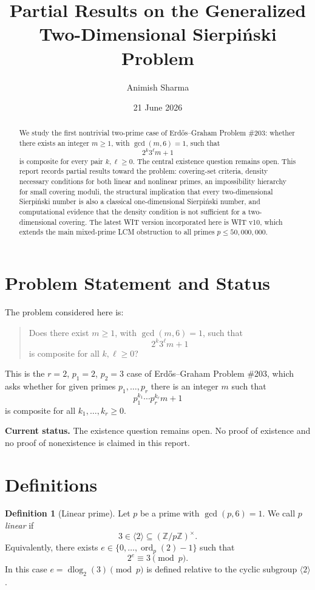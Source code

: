 \documentclass[11pt]{article}
\title{Partial Results on the Generalized Two-Dimensional Sierpi\'nski Problem}
\author{Animish Sharma}
\date{21 June 2026}
\theoremstyle{definition}
\newtheorem{definition}[theorem]{Definition}
\theoremstyle{remark}
\DeclareMathOperator{\ord}{ord}
\DeclareMathOperator{\dlog}{dlog}
\begin{document}
\maketitle

\begin{abstract}
We study the first nontrivial two-prime case of Erd\H{o}s--Graham Problem
\#203: whether there exists an integer \(m\geq 1\), with \(\gcd(m,6)=1\),
such that
\[
        2^k 3^\ell m+1
\]
is composite for every pair \(k,\ell\geq 0\).  The central existence question
remains open.  This report records partial results toward the problem:
covering-set criteria, density necessary conditions for both linear and
nonlinear primes, an impossibility hierarchy for small covering moduli, the
structural implication that every two-dimensional Sierpi\'nski number is also a
classical one-dimensional Sierpi\'nski number, and computational evidence that
the density condition is not sufficient for a two-dimensional covering.  The
latest WIT version incorporated here is WIT v10, which extends the main
mixed-prime LCM obstruction to all primes \(p\leq 50{,}000{,}000\).
\end{abstract}

\section{Problem Statement and Status}

The problem considered here is:

\begin{quote}
Does there exist \(m\geq 1\), with \(\gcd(m,6)=1\), such that
\[
        2^k3^\ell m+1
\]
is composite for all \(k,\ell\geq 0\)?
\end{quote}

This is the \(r=2\), \(p_1=2\), \(p_2=3\) case of Erd\H{o}s--Graham Problem
\#203, which asks whether for given primes \(p_1,\ldots,p_r\) there is an
integer \(m\) such that
\[
        p_1^{k_1}\cdots p_r^{k_r}m+1
\]
is composite for all \(k_1,\ldots,k_r\geq 0\).

\medskip
\noindent
\textbf{Current status.}  The existence question remains open.  No proof of
existence and no proof of nonexistence is claimed in this report.

\section{Definitions}

\begin{definition}[Linear prime]
Let \(p\) be a prime with \(\gcd(p,6)=1\).  We call \(p\) \emph{linear} if
\[
        3\in \langle 2\rangle \subseteq (\mathbb Z/p\mathbb Z)^\times.
\]
Equivalently, there exists \(e\in\{0,\ldots,\ord_p(2)-1\}\) such that
\[
        2^e\equiv 3 \pmod p.
\]
In this case \(e=\dlog_2(3)\pmod p\) is defined relative to the cyclic subgroup
\(\langle 2\rangle\).
\end{definition}
\end{document}
